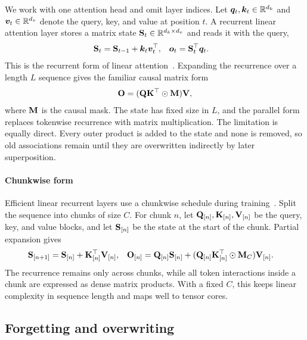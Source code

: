\documentclass[10pt, logo, onecolumn, copyright]{nv}
\begin{document}
We work with one attention head and omit layer indices. Let ${\bm{q}}_t, {\bm{k}}_t \in \mathbb{R}^{d_k}$ and ${\bm{v}}_t \in \mathbb{R}^{d_v}$ denote the query, key, and value at position $t$. A recurrent linear attention layer stores a matrix state ${\mathbf{S}}_t \in \mathbb{R}^{d_k \times d_v}$ and reads it with the query,
\begin{align}
    {\mathbf{S}}_t &= {\mathbf{S}}_{t-1} + {\bm{k}}_t {\bm{v}}_t^\top,
    &
    {\bm{o}}_t &= {\mathbf{S}}_t^\top {\bm{q}}_t .
\label{eq_linear_attention_recurrence}
\end{align}
This is the recurrent form of linear attention~\citep{katharopoulos_transformers_2020}. Expanding the recurrence over a length $L$ sequence gives the familiar causal matrix form
\begin{align}
    {\mathbf{O}} = ({\mathbf{Q}}{\mathbf{K}}^\top \odot {\mathbf{M}}){\mathbf{V}},
\label{eq_linear_attention_parallel}
\end{align}
where ${\mathbf{M}}$ is the causal mask. The state has fixed size in $L$, and the parallel form replaces tokenwise recurrence with matrix multiplication. The limitation is equally direct. Every outer product is added to the state and none is removed, so old associations remain until they are overwritten indirectly by later superposition.

\paragraph{Chunkwise form}
Efficient linear recurrent layers use a chunkwise schedule during training~\citep{hua_transformer_2022, sun2023retentive, yang_gated_2023}. Split the sequence into chunks of size $C$. For chunk $n$, let ${\mathbf{Q}}_{[n]}, {\mathbf{K}}_{[n]}, {\mathbf{V}}_{[n]}$ be the query, key, and value blocks, and let ${\mathbf{S}}_{[n]}$ be the state at the start of the chunk. Partial expansion gives
\begin{align}
    {\mathbf{S}}_{[n+1]} &= {\mathbf{S}}_{[n]} + {\mathbf{K}}_{[n]}^\top {\mathbf{V}}_{[n]},
    &
    {\mathbf{O}}_{[n]} &= {\mathbf{Q}}_{[n]}{\mathbf{S}}_{[n]} + ({\mathbf{Q}}_{[n]}{\mathbf{K}}_{[n]}^\top \odot {\mathbf{M}}_C){\mathbf{V}}_{[n]} .
\label{eq_linear_attention_chunk}
\end{align}
The recurrence remains only across chunks, while all token interactions inside a chunk are expressed as dense matrix products. With a fixed $C$, this keeps linear complexity in sequence length and maps well to tensor cores.

\subsection{Forgetting and overwriting}
\end{document}
